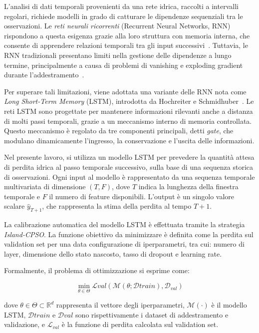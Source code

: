 \documentclass{article}
\begin{document}
L’analisi di dati temporali provenienti da una rete idrica, raccolti a intervalli regolari, 
richiede modelli in grado di catturare le dipendenze sequenziali tra le osservazioni. 
Le \emph{reti neurali ricorrenti} (Recurrent Neural Networks, RNN) rispondono a questa 
esigenza grazie alla loro struttura con memoria interna, che consente di apprendere relazioni 
temporali tra gli input successivi~\cite{elman1990finding}. Tuttavia, le RNN tradizionali 
presentano limiti nella gestione delle dipendenze a lungo termine, principalmente a causa di 
problemi di vanishing e exploding gradient durante l'addestramento~\cite{bengio1994learning}.

Per superare tali limitazioni, viene adottata una variante delle RNN nota come 
\emph{Long Short-Term Memory} (LSTM), introdotta da Hochreiter e 
Schmidhuber~\cite{hochreiter1997long}. Le reti LSTM sono progettate per mantenere informazioni 
rilevanti anche a distanza di molti passi temporali, grazie a un meccanismo interno di memoria 
controllata. Questo meccanismo è regolato da tre componenti principali, detti \emph{gate}, 
che modulano dinamicamente l’ingresso, la conservazione e l’uscita delle informazioni.

Nel presente lavoro, si utilizza un modello LSTM per prevedere la quantità attesa di perdita 
idrica al passo temporale successivo, sulla base di una sequenza storica di osservazioni. 
Ogni input al modello è rappresentato da una sequenza temporale multivariata di dimensione 
$(T, F)$, dove $T$ indica la lunghezza della finestra temporale e $F$ il numero di feature 
disponibili. L’output è un singolo valore scalare $\hat{y}_{T+1}$, che rappresenta la stima 
della perdita al tempo $T+1$.

La calibrazione automatica del modello LSTM è effettuata tramite la strategia 
\emph{Island-CPSO}. La funzione obiettivo da minimizzare è definita come la perdita sul 
validation set per una data configurazione di iperparametri, tra cui: numero di layer, dimensione 
dello stato nascosto, tasso di dropout e learning rate.

Formalmente, il problema di ottimizzazione si esprime come:

\begin{equation}
\min_{\theta \in \Theta} \mathcal{L}{val}(\mathcal{M}(\theta; \mathcal{D}{train}), \mathcal{D}_{val})
\end{equation}

dove $\theta \in \Theta \subset \mathbb{R}^d$ rappresenta il vettore degli iperparametri, $\mathcal{M}(\cdot)$ è il 
modello LSTM, $\mathcal{D}{train}$ e $\mathcal{D}{val}$ sono rispettivamente i dataset di addestramento e 
validazione, e $\mathcal{L}_{val}$ è la funzione di perdita calcolata sul validation set.
\end{document}
